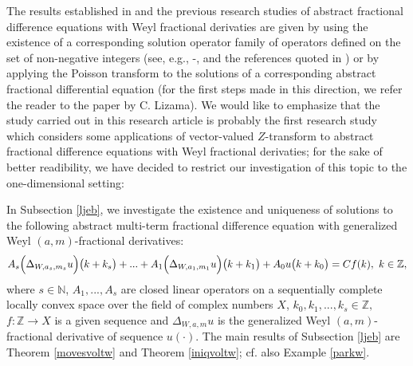 \documentclass{amsart}
\theoremstyle{definition}
\theoremstyle{remark}
\numberwithin{equation}{section}
\begin{document}
The results established in \cite{jan} and the previous research studies of abstract fractional difference equations with Weyl fractional derivaties are given by using the existence of a corresponding solution operator family of operators defined on the set of non-negative integers (see, e.g., \cite{abadias}-\cite{abadias1}, \cite[Theorem 4.1, Theorem 4.3, Theorem 4.5]{jan} and the references quoted in \cite{funkcionalne}) or by applying the Poisson transform to the solutions of  a corresponding abstract  fractional differential equation (for the first steps made in this direction, we refer the reader to the paper \cite{lizama-pois} by C. Lizama). We would like to emphasize that the study carried out in this research article is probably the first research study which considers some applications of vector-valued $Z$-transform to abstract fractional difference equations with Weyl fractional derivaties; for the sake of better readibility, we have decided to restrict our investigation of this topic to the one-dimensional setting:

In Subsection \ref{ljeb}, we investigate the existence and uniqueness of solutions to the following abstract multi-term fractional difference equation with generalized Weyl $(a,m)$-fractional derivatives:{\small
\begin{align*}
A_{s}\Bigl(\Delta_{W,a_{s},m_{s}}u\Bigr)\bigl(k+k_{s}\bigr)+...+A_{1}\Bigl(\Delta_{W,a_{1},m_{1}}u\Bigr)\bigl(k+k_{1}\bigr)+A_{0}u\bigl(k+k_{0}\bigr)=Cf(k),\ k\in {\mathbb Z},
\end{align*}}where $s\in {\mathbb N}$, $A_{1},...,A_{s}$ are closed linear operators on a sequentially complete locally convex space over the field of complex numbers $X$, $k_{0},k_{1},...,k_{s}\in {\mathbb Z},$ $ f: {\mathbb Z} \rightarrow X$ is a given sequence and $\Delta_{W,a,m}u$ is the generalized Weyl $(a,m)$-fractional derivative of sequence $u(\cdot).$ The main results of Subsection
\ref{ljeb} are Theorem \ref{movesvoltw} and Theorem \ref{iniqvoltw}; cf. also Example \ref{parkw}.
\vspace{0.1cm} 
\end{document}
